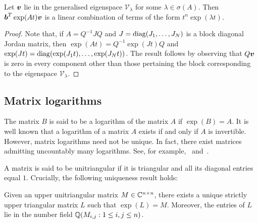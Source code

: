 \begin{proposition}
  Let $\boldsymbol{v}$ lie in the generalised eigenspace
  $\mathcal{V}_{\lambda}$ for some $\lambda \in \sigma(A)$.  Then
  $\boldsymbol{b}^{T}\exp(At)\boldsymbol{v}$ is a linear combination
  of terms of the form $t^{n}\exp(\lambda t)$.
\label{prop:linear}
\end{proposition}

\begin{proof}
  Note that, if $A=Q^{-1}JQ$ and $J=\operatorname{diag}(J_{1},\ldots,J_{N})$ is a block diagonal Jordan matrix, then $\exp(At)=Q^{-1}\exp(Jt)Q$ and $\exp(Jt)=\operatorname{diag}(\exp(J_{1}t),\ldots,\exp(J_{N}t))$.
The result follows by observing that $Q\boldsymbol{v}$ is zero in every component other than those pertaining the block corresponding to the eigenspace $\mathcal{V}_{\lambda}$.
\end{proof}

\subsection{Matrix logarithms}

The matrix $B$ is said to be a logarithm of the matrix $A$ if $\exp(B) = A$. It is well known that a logarithm of a matrix $A$ exists if and only if $A$ is invertible. However, matrix logarithms need not be unique. In fact, there exist matrices admitting uncountably many logarithms. See, for example,~\cite{MatrixLogs1} and~\cite{MatrixLogs2}.

A matrix is said to be unitriangular if it is triangular and all its diagonal entries equal $1$. Crucially, the following uniqueness result holds:

\begin{theorem}
\label{thm:log_uniqueness}
Given an upper unitriangular matrix $M \in \mathbb{C}^{n \times n}$, there exists a unique strictly upper triangular matrix $L$ such that $\exp(L)=M$. Moreover, the entries of $L$ lie in the number field $\mathbb{Q}(M_{i,j}: 1 \leq i,j \leq n)$.
\end{theorem}

